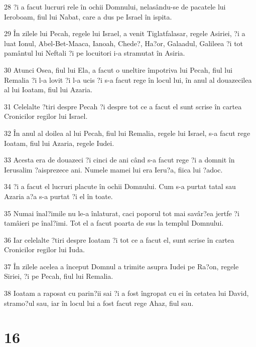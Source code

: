 \par 28 ?i a facut lucruri rele în ochii Domnului, nelasându-se de pacatele lui Ieroboam, fiul lui Nabat, care a dus pe Israel în ispita.
\par 29 În zilele lui Pecah, regele lui Israel, a venit Tiglatfalasar, regele Asiriei, ?i a luat Ionul, Abel-Bet-Maaca, Ianoah, Chede?, Ha?or, Galaadul, Galileea ?i tot pamântul lui Neftali ?i pe locuitori i-a stramutat în Asiria.
\par 30 Atunci Osea, fiul lui Ela, a facut o uneltire împotriva lui Pecah, fiul lui Remalia ?i l-a lovit ?i l-a ucis ?i s-a facut rege în locul lui, în anul al douazecilea al lui Ioatam, fiul lui Azaria.
\par 31 Celelalte ?tiri despre Pecah ?i despre tot ce a facut el sunt scrise în cartea Cronicilor regilor lui Israel.
\par 32 În anul al doilea al lui Pecah, fiul lui Remalia, regele lui Israel, s-a facut rege Ioatam, fiul lui Azaria, regele Iudei.
\par 33 Acesta era de douazeci ?i cinci de ani când s-a facut rege ?i a domnit în Ierusalim ?aisprezece ani. Numele mamei lui era Ieru?a, fiica lui ?adoc.
\par 34 ?i a facut el lucruri placute în ochii Domnului. Cum s-a purtat tatal sau Azaria a?a s-a purtat ?i el în toate.
\par 35 Numai înal?imile nu le-a înlaturat, caci poporul tot mai savâr?ea jertfe ?i tamâieri pe înal?imi. Tot el a facut poarta de sus la templul Domnului.
\par 36 Iar celelalte ?tiri despre Ioatam ?i tot ce a facut el, sunt scrise în cartea Cronicilor regilor lui Iuda.
\par 37 În zilele acelea a început Domnul a trimite asupra Iudei pe Ra?on, regele Siriei, ?i pe Pecah, fiul lui Remalia.
\par 38 Ioatam a raposat cu parin?ii sai ?i a fost îngropat cu ei în cetatea lui David, stramo?ul sau, iar în locul lui a fost facut rege Ahaz, fiul sau.

\chapter{16}


